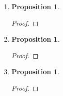 \documentclass{article}
\newtheorem{prop}[thm]{Proposition}
\begin{document}
\begin{enumerate}
\begin{proof}
\end{proof}

\item 
\begin{prop}
    
\end{prop}
\begin{proof}

\end{proof}

\item 
\begin{prop}
  
\end{prop}
\begin{proof}

\end{proof}

\item 
\begin{prop}
  
\end{prop}
\begin{proof}

\end{proof}
    
\end{enumerate}
\end{document}
